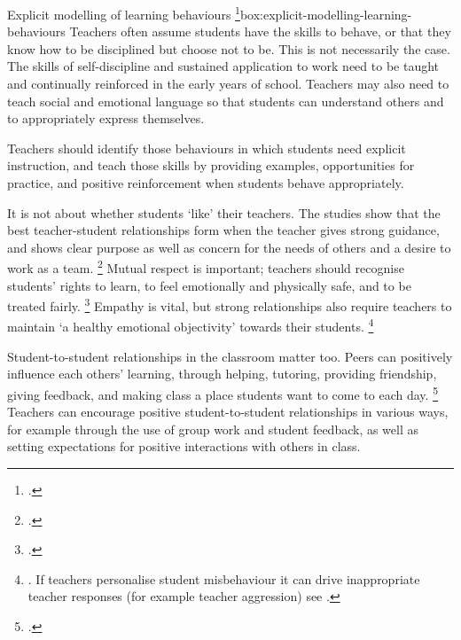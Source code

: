 \documentclass[FrontPage]{grattan}
\begin{document}
\begin{verysmallbox}[t]{Explicit modelling of learning behaviours%
\footcites{Brophy2006HistoryResearchClassroom}{Watkins2005ClassroomsLearningCommunities}}{box:explicit-modelling-learning-behaviours}
Teachers often assume students have the skills to behave, or that they know how to be disciplined but choose not to be. This is not necessarily the case. The skills of self-discipline and sustained application to work need to be taught and continually reinforced in the early years of school. Teachers may also need to teach social and emotional language so that students can understand others and to appropriately express themselves.
 
Teachers should identify those behaviours in which students need explicit instruction, and teach those skills by providing examples, opportunities for practice, and positive reinforcement when students behave appropriately. 
\end{verysmallbox} 

It is not about whether students `like' their teachers. The studies show that the best teacher-student relationships form when the teacher gives strong guidance, and shows clear purpose as well as concern for the needs of others and a desire to work as a team.%
    \footcite{Marzano2003ClassroomManagementWorks} 
Mutual respect is important; teachers should recognise students' rights to learn, to feel emotionally and physically safe, and to be treated fairly.%
    \footcites{Lewis2011DevelopmentalManagementApproach}{Rogers2015ClassroomBehaviourPractical} Empathy is vital, but strong relationships also require teachers to maintain `a healthy emotional objectivity' towards their students.%
    \footnote{\textcites{Hattie2008visiblelearningsynthesis}{Marzano2003ClassroomManagementWorks}. If teachers personalise student misbehaviour it can drive inappropriate teacher responses (for example teacher aggression) see \textcite{RileyBrew2010WhyDidYouDoThat}.}

Student-to-student relationships in the classroom matter too. Peers can positively influence each others' learning, through helping, tutoring, providing friendship, giving feedback, and making class a place students want to come to each day.%
    \footcite{Wilkinson-Fung-2002-Small-group-composition-peer-effects}
Teachers can encourage positive student-to-student relationships in various ways, for example through the use of group work and student feedback, as well as setting expectations for positive interactions with others in class.
\end{document}
